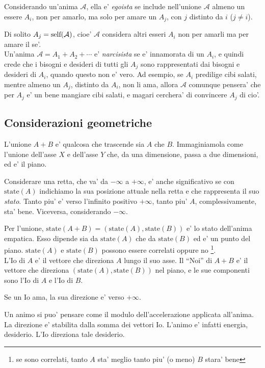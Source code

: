 Considerando un'anima $\mathcal{A}$, ella e' \emph{egoista} se include nell'unione $\mathcal{A}$ almeno un essere $A_i$, non per amarlo, ma solo per amare un $A_j$, con $j$ distinto da $i$ ($j\ne i$).

Di solito $A_j = \textrm{self}(\mathcal{A})$, cioe' $\mathcal{A}$ considera altri esseri $A_i$ non per amarli ma per amare il se'.\\

Un'anima $\mathcal{A}=A_1+A_2+\cdots$ e' \emph{narcisista} se e' innamorata di un $A_i$, e quindi crede che i bisogni e desideri di tutti gli $A_j$ sono rappresentati dai bisogni e desideri di $A_i$, quando questo non e' vero. Ad esempio, se $A_i$ predilige cibi salati, mentre almeno un $A_j$, distinto da $A_i$, non li ama, allora $\mathcal{A}$ comunque pensera' che per $A_j$ e' un bene mangiare cibi salati, e magari cerchera' di convincere $A_j$ di cio'.

\subsection{Considerazioni geometriche}
L'unione $A+B$ e' qualcosa che trascende sia $A$ che $B$. Immaginiamola come l'unione dell'asse $X$ e dell'asse $Y$ che, da una dimensione, passa a due dimensioni, ed e' il piano.

\def\state{\textrm{state}}

Considerare una retta, che va' da $-\infty$ a $+\infty$, e' anche significativo se con $\state(A)$ indichiamo la sua posizione attuale nella retta e che rappresenta il suo \emph{stato}. Tanto piu' e' verso l'infinito positivo $+\infty$, tanto piu' $A$, complessivamente, sta' bene. Viceversa, considerando $-\infty$.

Per l'unione, $\state(A+B)=(\state(A),\state(B))$ e' lo stato dell'anima empatica. Esso dipende sia da $\state(A)$ che da $\state(B)$ ed e' un punto del piano. $\state(A)$ e $\state(B)$ possono essere correlati oppure no \footnote{se sono correlati, tanto $A$ sta' meglio tanto piu' (o meno) $B$ stara' bene}.\\

L'Io di $A$ e' il vettore che direziona $A$ lungo il suo asse. Il ``Noi'' di $A+B$ e' il vettore che direziona $(\state(A),\state(B))$ nel piano, e le sue componenti sono l'Io di $A$ e l'Io di $B$.

Se un Io ama, la sua direzione e' verso $+\infty$.

Un animo si puo' pensare come il modulo dell'accelerazione applicata all'anima. La direzione e' stabilita dalla somma dei vettori Io. L'animo e' infatti energia, desiderio. L'Io direziona tale desiderio.\\

